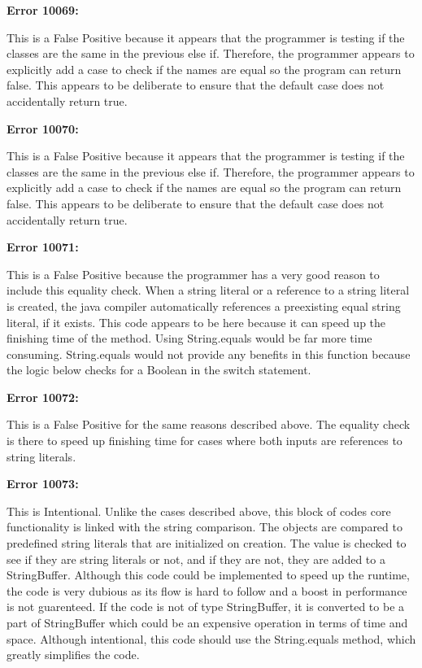 \documentclass{article}
\begin{document}
\begin{enumerate}[(a)]
  \textbf{Error 10069:}

  This is a False Positive because it appears that the programmer is testing if the classes are the same in the previous else if. Therefore, the programmer appears to explicitly add a case to check if the names are equal so the program can return false. This appears to be deliberate to ensure that the default case does not accidentally return true.

  \textbf{Error 10070:}

  This is a False Positive because it appears that the programmer is testing if the classes are the same in the previous else if. Therefore, the programmer appears to explicitly add a case to check if the names are equal so the program can return false. This appears to be deliberate to ensure that the default case does not accidentally return true.

  \textbf{Error 10071:}

  This is a False Positive because the programmer has a very good reason to include this equality check. When a string literal or a reference to a string literal is created, the java compiler automatically references a preexisting equal string literal, if it exists. This code appears to be here because it can speed up the finishing time of the method. Using String.equals would be far more time consuming. String.equals would not provide any benefits in this function because the logic below checks for a Boolean in the switch statement.

  \textbf{Error 10072:}

  This is a False Positive for the same reasons described above. The equality check is there to speed up finishing time for cases where both inputs are references to string literals.

  \textbf{Error 10073:}

  This is Intentional. Unlike the cases described above, this block of codes core functionality is linked with the string comparison. The objects are compared to predefined string literals that are initialized on creation. The value is checked to see if they are string literals or not, and if they are not, they are added to a StringBuffer. Although this code could be implemented to speed up the runtime, the code is very dubious as its flow is hard to follow and a boost in performance is not guarenteed. If the code is not of type StringBuffer, it is converted to be a part of StringBuffer which could be an expensive operation in terms of time and space. Although intentional, this code should use the String.equals method, which greatly simplifies the code.


\end{enumerate}
\end{document}
